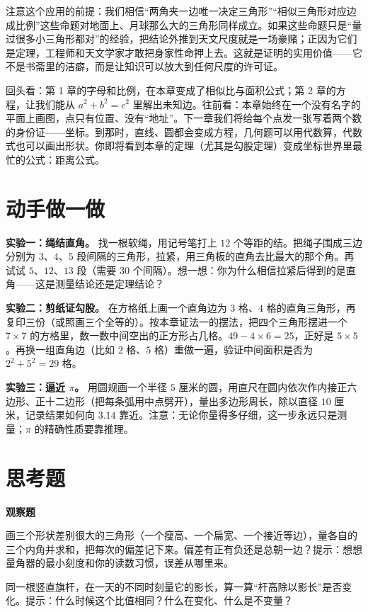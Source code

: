 注意这个应用的前提：我们相信“两角夹一边唯一决定三角形”“相似三角形对应边成比例”这些命题对地面上、月球那么大的三角形同样成立。如果这些命题只是“量过很多小三角形都对”的经验，把结论外推到天文尺度就是一场豪赌；正因为它们是定理，工程师和天文学家才敢把身家性命押上去。这就是证明的实用价值——它不是书斋里的洁癖，而是让知识可以放大到任何尺度的许可证。

\begin{lianjie}
回头看：第 1 章的字母和比例，在本章变成了相似比与面积公式；第 2 章的方程，让我们能从 $a^2+b^2=c^2$ 里解出未知边。往前看：本章始终在一个没有名字的平面上画图，点只有位置、没有“地址”。下一章我们将给每个点发一张写着两个数的身份证——坐标。到那时，直线、圆都会变成方程，几何题可以用代数算，代数式也可以画出形状。你即将看到本章的定理（尤其是勾股定理）变成坐标世界里最忙的公式：距离公式。
\end{lianjie}

\section{动手做一做}

\begin{shiyan}
\textbf{实验一：绳结直角。} 找一根软绳，用记号笔打上 $12$ 个等距的结。把绳子围成三边分别为 $3$、$4$、$5$ 段间隔的三角形，拉紧，用三角板的直角去比最大的那个角。再试试 $5$、$12$、$13$ 段（需要 $30$ 个间隔）。想一想：你为什么相信拉紧后得到的是直角——这是测量结论还是定理结论？

\textbf{实验二：剪纸证勾股。} 在方格纸上画一个直角边为 $3$ 格、$4$ 格的直角三角形，再复印三份（或照画三个全等的）。按本章证法一的摆法，把四个三角形摆进一个 $7\times7$ 的方格里，数一数中间空出的正方形占几格。$49-4\times6=25$，正好是 $5\times5$。再换一组直角边（比如 $2$ 格、$5$ 格）重做一遍，验证中间面积是否为 $2^2+5^2=29$ 格。

\textbf{实验三：逼近 $\pi$。} 用圆规画一个半径 $5$ 厘米的圆，用直尺在圆内依次作内接正六边形、正十二边形（把每条弧用中点劈开），量出多边形周长，除以直径 $10$ 厘米，记录结果如何向 $3.14$ 靠近。注意：无论你量得多仔细，这一步永远只是测量；$\pi$ 的精确性质要靠推理。
\end{shiyan}

\section*{思考题}

\textbf{观察题}
\begin{sikao}
\item 画三个形状差别很大的三角形（一个瘦高、一个扁宽、一个接近等边），量各自的三个内角并求和，把每次的偏差记下来。偏差有正有负还是总朝一边？提示：想想量角器的最小刻度和你的读数习惯，误差从哪里来。
\item 同一根竖直旗杆，在一天的不同时刻量它的影长，算一算“杆高除以影长”是否变化。提示：什么时候这个比值相同？什么在变化、什么是不变量？
\end{sikao}

